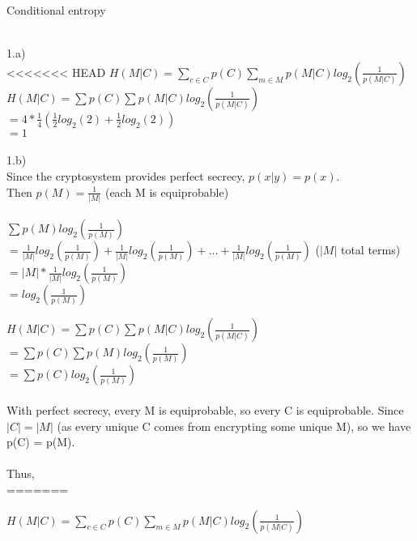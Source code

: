 \documentclass{assignment}
\newcommand\tab[1][0.5cm]{\hspace*{#1}}
\begin{document}
\begin{problemlist}
\pbitem Conditional entropy
\begin{problem}
\begin{answer}
\\
1.a)\\
<<<<<<< HEAD
$H(M|C)=\sum_{c\in C}p(C)\sum_{m\in M}p(M|C)log_2(\frac{1}{p(M|C)})$\\
$H(M|C)=\sum p(C)\sum p(M|C)log_2(\frac{1}{p(M|C)})$\\
$=4*\frac{1}{4}(\frac{1}{2}log_2(2)+ \frac{1}{2}log_2(2))$\\
$=1$\\
\\
1.b)\\
Since the cryptosystem provides perfect secrecy, $p(x|y)=p(x)$.\\
Then $p(M) = \frac{1}{|M|}$ (each M is equiprobable)\\
\\
$\sum p(M)log_2(\frac{1}{p(M)})$\\
\tab$=\frac{1}{|M|}log_2(\frac{1}{p(M)})+\frac{1}{|M|}log_2(\frac{1}{p(M)})+...+\frac{1}{|M|}log_2(\frac{1}{p(M)})$  ($|M|$ total terms)\\
\tab$=|M|*\frac{1}{|M|}log_2(\frac{1}{p(M)})$ \\
\tab$=log_2(\frac{1}{p(M)})$ 

$H(M|C)=\sum p(C)\sum p(M|C)log_2(\frac{1}{p(M|C)})$\\
$=\sum p(C)\sum p(M)log_2(\frac{1}{p(M)})$\\
$=\sum p(C)log_2(\frac{1}{p(M)})$\\
\\
With perfect secrecy, every M is equiprobable, so every C is equiprobable.
Since $|C| = |M|$  (as every unique C comes from encrypting some unique M), so we have
p(C) = p(M).\\
\\
Thus,\\
=======

$H(M|C)=\sum_{c\in C}p(C)\sum_{m\in M}p(M|C)log_2(\frac{1}{p(M|C)})$\\


\end{answer}
\end{problem}
\end{problemlist}
\end{document}
